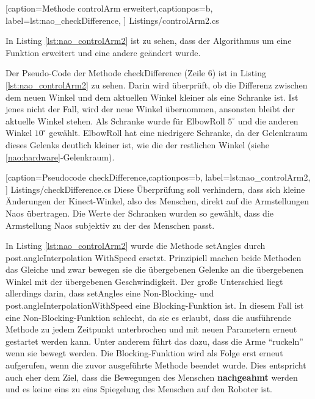 
    [caption={Methode \textsf{controlArm erweitert}},captionpos=b,
       label=lst:nao_checkDifference,
       ]	
 {Listings/controlArm2.cs}

In Listing \ref{lst:nao_controlArm2} ist zu sehen, dass der Algorithmus um eine Funktion erweitert und eine andere geändert wurde.

Der Pseudo-Code der Methode \textsf{checkDifference} (Zeile 6) ist in Listing \ref{lst:nao_controlArm2} zu sehen. Darin wird überprüft, ob die Differenz zwischen dem neuen Winkel und dem aktuellen Winkel kleiner als eine Schranke ist. Ist jenes nicht der Fall, wird der neue Winkel übernommen, ansonsten bleibt der aktuelle Winkel stehen. 
Als Schranke wurde für ElbowRoll $5^\circ$ und die anderen Winkel $10^\circ$ gewählt. ElbowRoll hat eine niedrigere Schranke, da der Gelenkraum dieses Gelenks deutlich kleiner ist, wie die der restlichen Winkel (siehe \ref{nao:hardware}-Gelenkraum). 

    [caption={Pseudocode \textsf{checkDifference}},captionpos=b,
       label=lst:nao_controlArm2,
       ]	
 {Listings/checkDifference.cs}
Diese Überprüfung soll verhindern, dass sich kleine Änderungen der Kinect-Winkel, also des Menschen, direkt auf die Armstellungen Naos übertragen. Die Werte der Schranken wurden so gewählt, dass die Armstellung Naos subjektiv zu der des Menschen passt.


In Listing \ref{lst:nao_controlArm2} wurde die Methode \textsf{setAngles} durch \textsf{post.angleInterpolation
WithSpeed} ersetzt. Prinzipiell machen beide Methoden das Gleiche und zwar bewegen sie die übergebenen Gelenke an die übergebenen Winkel mit der übergebenen Geschwindigkeit. Der große Unterschied liegt allerdings darin, dass \textsf{setAngles} eine Non-Blocking- und \textsf{post.angleInterpolationWithSpeed} eine Blocking-Funktion ist. In diesem Fall ist eine Non-Blocking-Funktion schlecht, da sie es erlaubt, dass die ausführende Methode zu jedem Zeitpunkt unterbrochen  und mit neuen Parametern erneut gestartet werden kann. Unter anderem führt das dazu, dass die Arme "`ruckeln"' wenn sie bewegt werden. Die Blocking-Funktion wird als Folge erst erneut aufgerufen, wenn die zuvor ausgeführte Methode beendet wurde. Dies entspricht auch eher dem Ziel, dass die Bewegungen des Menschen \textbf{nachgeahmt} werden und es keine eins zu eins Spiegelung des Menschen auf den Roboter ist.

 